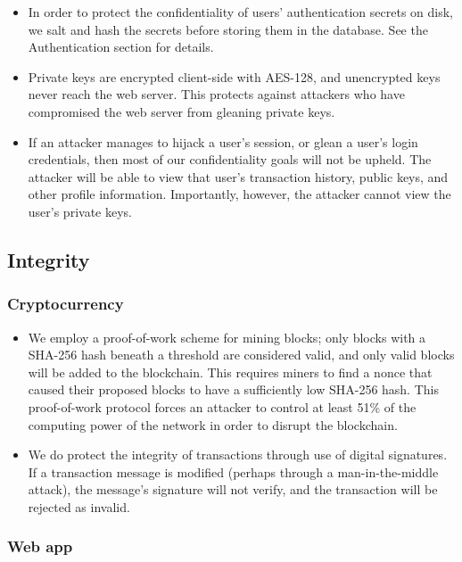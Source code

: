 \documentclass[12pt]{article}
\begin{document}
\begin{itemize}
	\item In order to protect the confidentiality of users' authentication secrets on disk, we salt and hash the secrets before storing them in the database.
	See the Authentication section for details.
	\item Private keys are encrypted client-side with AES-128, and unencrypted keys never reach the web server.
	This protects against attackers who have compromised the web server from gleaning private keys.
	\item If an attacker manages to hijack a user's session, or glean a user's login credentials, then most of our confidentiality goals will not be upheld.
	The attacker will be able to view that user's transaction history, public keys, and other profile information.
	Importantly, however, the attacker cannot view the user's private keys.
\end{itemize}

\subsection{Integrity}

\subsubsection*{Cryptocurrency}

\begin{itemize}
	\item We employ a proof-of-work scheme for mining blocks; only blocks with a SHA-256 hash beneath a threshold are considered valid, and only valid blocks will be added to the blockchain.
	This requires miners to find a nonce that caused their proposed blocks to have a sufficiently low SHA-256 hash.
	This proof-of-work protocol forces an attacker to control at least 51\% of the computing power of the network in order to disrupt the blockchain\cite{bitcoin}.
	\item We do protect the integrity of transactions through use of digital signatures.
	If a transaction message is modified (perhaps through a man-in-the-middle attack), the message's signature will not verify, and the transaction will be rejected as invalid.
\end{itemize}

\subsubsection*{Web app}
\end{document}
